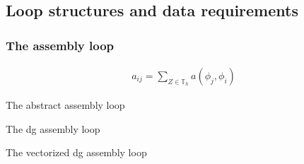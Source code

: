 \subsection{Loop structures and data requirements}

\begin{frame}[fragile]
  \frametitle{The assembly loop}
  \begin{gather*}
    a_{ij} = \sum_{Z\in \mathbb T_h} a(\phi_j, \phi_i)
  \end{gather*}
  \begin{block}{}
    \small
    
  \end{block}  
\end{frame}

\begin{frame}[fragile]
  \begin{block}{The abstract assembly loop}
    
  \end{block}
\end{frame}

\begin{frame}[fragile]
  \begin{block}{The dg assembly loop}
    
  \end{block}  
\end{frame}

\begin{frame}[fragile]
  \begin{block}{The vectorized dg assembly loop}
    
  \end{block}  
\end{frame}

